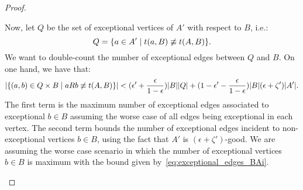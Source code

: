 \begin{lemma}
\begin{proof}
\begin{enumerate}[label=(\alph*), ref=\alph*]
                    Now, let $Q$ be the set of exceptional vertices of $A'$ with respect to $B$, i.e.:
                    \[
                        Q = \{ a \in A' \mid t(a, B) \not\equiv t(A, B) \}.
                    \]
                    We want to double-count the number of exceptional edges between $Q$ and $B$.
                    On one hand, we have that:
                    \[
                        | \{ (a,b) \in Q \times B \mid aRb \not\equiv t(A, B) \} | <
                        ( \epsilon' + \frac{\epsilon}{1 - \epsilon} ) | B | | Q | +
                        ( 1 - \epsilon' - \frac{\epsilon}{1 - \epsilon} ) | B | ( \epsilon + \zeta' ) | A' |.
                    \]
                    The first term is the maximum number of exceptional edges associated to exceptional $b \in B$
                    assuming the worse case of all edges being exceptional in each vertex.
                    The second term bounds the number of exceptional edges incident to
                    non-exceptional vertices $b \in B$, using the fact that $A'$ is $(\epsilon + \zeta')$-good.
                    We are assuming the worse case scenario in which the number of exceptional vertices $b \in B$ is maximum
                    with the bound given by~\eqref{eq:exceptional_edges_BAi}.


\end{enumerate}
\end{proof}
\end{lemma}
